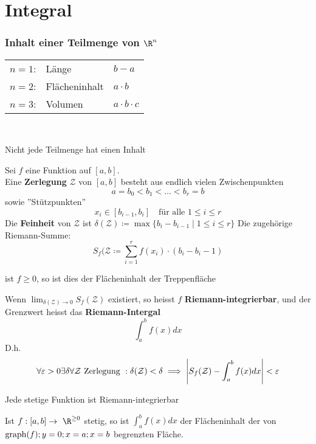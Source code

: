 \chapter{Integral}
\subsection{Inhalt einer Teilmenge von \texorpdfstring{$\R^n$}{R^n}}
\begin{tabular}{ l l l }
	$n=1$:	&Länge		&$b-a$			\\
	$n=2$:	&Flächeninhalt	&$a \cdot b$		\\
	$n=3$:	&Volumen		&$a \cdot b \cdot c$	
\end{tabular}\\
\begin{bem}
	Nicht jede Teilmenge hat einen Inhalt
\end{bem}
Sei $f$ eine Funktion auf $[a,b]$. \\
Eine \textbf{Zerlegung} $\mathcal{Z}$ von $[a,b]$ besteht aus endlich vielen Zwischenpunkten
\[ a = b_0 < b_1 < \dots < b_r = b \]
sowie ''Stützpunkten''
\[ x_i \in [b_{i-1},b_i] \quad \text{für alle } 1 \leq i \leq r \]
Die \textbf{Feinheit} von $\mathcal{Z}$ ist $\delta(\mathcal{Z}) \coloneqq \max\{ b_i - b_{i-1} \mid 1 \leq i \leq r \}$
Die zugehörige Riemann-Summe:
\[ S_f(\mathcal{Z} \coloneqq \sum_{i=1}^r f(x_i) \cdot (b_i - b_i-1) \]
\begin{bem}
	ist $f \geq 0$, so ist dies der Flächeninhalt der Treppenfläche
\end{bem}
\begin{def*}[note = Riemann-Integral , index = Riemann-Integral]
	Wenn $\lim_{\delta(\mathcal{Z}) \rightarrow 0} S_f(\mathcal{Z})$ existiert, so heisst $f$ \textbf{Riemann-integrierbar}, und der Grenzwert heisst das \textbf{Riemann-Intergal}
	\[ \int_a^b f(x) dx \]
	D.h.
	\[ \forall \epsilon > 0 \exists \delta \forall \mathcal{Z} \text{ Zerlegung }: \delta(\mathcal{Z}) < \delta \implies \abs{S_f(\mathcal{Z}) - \int_a^b f(x) dx} < \epsilon \]
\end{def*}
\begin{satz*}
	Jede stetige Funktion ist Riemann-integrierbar
\end{satz*}
\begin{fakt}
	Ist $f: [a,b] \rightarrow \R^{\geq 0}$ stetig, so ist $\int_a^b f(x) dx$ der Flächeninhalt der von $\operatorname{graph}(f) ; y = 0 ; x = a ; x = b$ begrenzten Fläche.
\end{fakt}

